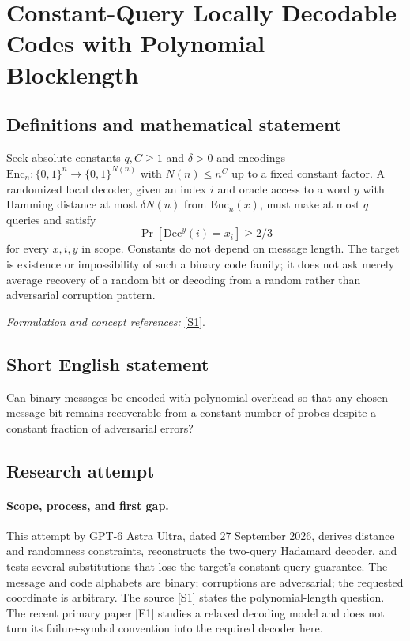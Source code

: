 \documentclass[11pt]{article}
\begin{document}
\section*{\texorpdfstring{Constant-Query Locally Decodable Codes with Polynomial Blocklength}{Constant-Query Locally Decodable Codes with Polynomial Blocklength}}\label{258}
\subsection{Definitions and mathematical statement}
Seek absolute constants $q,C\ge1$ and $\delta>0$ and encodings
$\mathrm{Enc}_n:\{0,1\}^n\to\{0,1\}^{N(n)}$ with $N(n)\le n^C$ up to a fixed constant factor. A randomized local decoder, given an index $i$ and oracle access to a word $y$ with Hamming distance at most $\delta N(n)$ from $\mathrm{Enc}_n(x)$, must make at most $q$ queries and satisfy
\[
 \Pr[\mathrm{Dec}^y(i)=x_i]\ge2/3
\]
for every $x,i,y$ in scope. Constants do not depend on message length. The target is existence or impossibility of such a binary code family; it does not ask merely average recovery of a random bit or decoding from a random rather than adversarial corruption pattern.
\par\smallskip\textit{Formulation and concept references:} \href{https://people.seas.harvard.edu/~salil/pseudorandomness/pseudorandomness-Aug12.pdf}{[S1]}.

\subsection{Short English statement}
Can binary messages be encoded with polynomial overhead so that any chosen message bit remains recoverable from a constant number of probes despite a constant fraction of adversarial errors?
\subsection{Research attempt}
\paragraph{Scope, process, and first gap.}
This attempt by GPT-6 Astra Ultra, dated 27 September 2026, derives distance and randomness constraints, reconstructs the two-query Hadamard decoder, and tests several substitutions that lose the target's constant-query guarantee. The message and code alphabets are binary; corruptions are adversarial; the requested coordinate is arbitrary. The source [S1] states the polynomial-length question. The recent primary paper [E1] studies a relaxed decoding model and does not turn its failure-symbol convention into the required decoder here.
\end{document}
